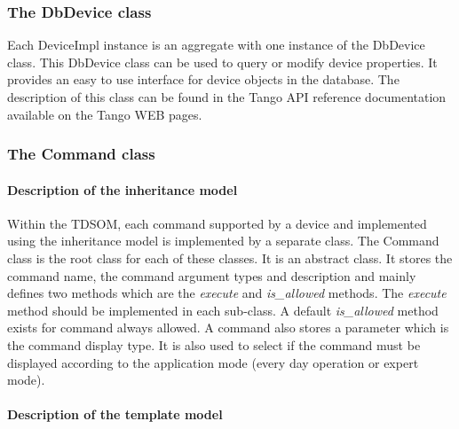 \subsubsection{The DbDevice class}

Each DeviceImpl instance is an aggregate with one instance of the
DbDevice class. This DbDevice class can be used to
query or modify device properties. It provides
an easy to use interface for device objects in the database. The description
of this class can be found in the Tango API reference documentation
available on the Tango WEB pages.

\subsubsection{The Command class}

\paragraph{Description of the inheritance model}

Within the TDSOM, each command supported by a device
and implemented using the inheritance model is implemented by a separate
class. The Command class is the root class for each
of these classes. It is an abstract class. It stores the command name,
the command argument types and description and mainly defines two
methods which are the \emph{execute} and \emph{is\_allowed}
methods. The \emph{execute} method should be implemented
in each sub-class. A default \emph{is\_allowed} method exists for
command always allowed. A command also stores a parameter which is
the command display type. It is also used to select if the command
must be displayed according to the application mode (every day operation
or expert mode).

\paragraph{Description of the template model}


